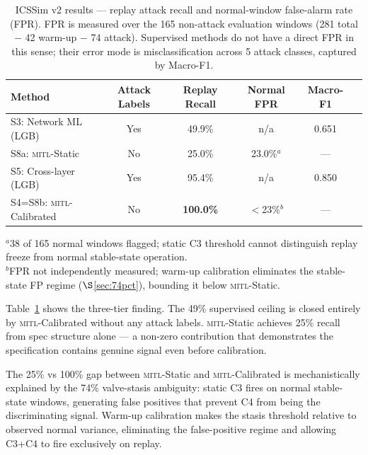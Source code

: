 \documentclass[sigconf,anonymous,review]{acmart}
\newcommand{\mitl}{\textsc{mitl}\xspace}
\begin{document}
\begin{table}[h]
\centering
\caption{ICSSim v2 results — replay attack recall and normal-window false-alarm
rate (FPR).  FPR is measured over the 165 non-attack evaluation windows
(281 total $-$ 42 warm-up $-$ 74 attack).  Supervised methods do not have a
direct FPR in this sense; their error mode is misclassification across 5 attack
classes, captured by Macro-F1.}
\label{tab:icssim}
\begin{tabular}{lccccc}
\toprule
Method & Attack Labels & Replay Recall & Normal FPR & Macro-F1 \\
\midrule
S3: Network ML (LGB)      & Yes & 49.9\% & n/a & 0.651 \\
S8a: \mitl-Static         & No  & 25.0\% & 23.0\%$^{a}$ & --- \\
S5: Cross-layer (LGB)     & Yes & 95.4\% & n/a & 0.850 \\
S4=S8b: \mitl-Calibrated  & No  & \textbf{100.0\%} & $<$23\%$^{b}$ & --- \\
\bottomrule
\end{tabular}
\smallskip\par\noindent
\footnotesize
$^{a}$38 of 165 normal windows flagged; static C3 threshold cannot distinguish
replay freeze from normal stable-state operation.\\
$^{b}$FPR not independently measured; warm-up calibration eliminates the
stable-state FP regime ($\S$\ref{sec:74pct}), bounding it below \mitl-Static.
\end{table}

Table~\ref{tab:icssim} shows the three-tier finding.  The 49\% supervised
ceiling is closed entirely by \mitl-Calibrated without any attack labels.
\mitl-Static achieves 25\% recall from spec structure alone — a non-zero
contribution that demonstrates the specification contains genuine signal even
before calibration.

The 25\% vs 100\% gap between \mitl-Static and \mitl-Calibrated is
mechanistically explained by the 74\% valve-stasis ambiguity:
static C3 fires on normal stable-state windows, generating false positives
that prevent C4 from being the discriminating signal.  Warm-up calibration
makes the stasis threshold relative to observed normal variance, eliminating
the false-positive regime and allowing C3+C4 to fire exclusively on replay.
\end{document}
